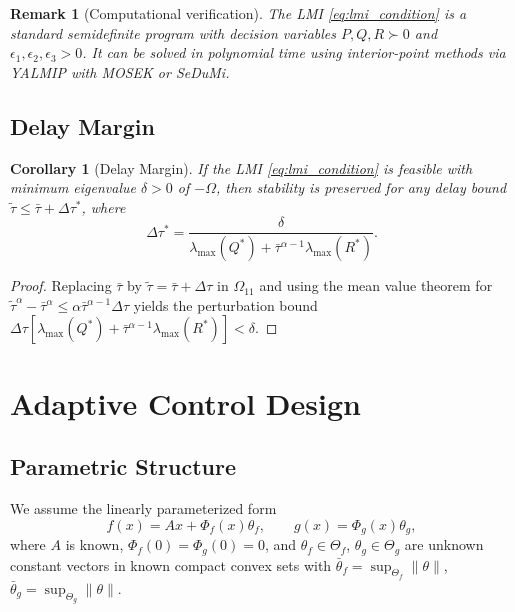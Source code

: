 \documentclass[12pt,a4paper]{article}
\newtheorem{corollary}[theorem]{Corollary}
\newtheorem{remark}{Remark}
\begin{document}
\begin{remark}[Computational verification]
The LMI \eqref{eq:lmi_condition} is a standard semidefinite program with decision variables $P, Q, R \succ 0$ and $\epsilon_1, \epsilon_2, \epsilon_3 > 0$. It can be solved in polynomial time using interior-point methods via YALMIP \cite{lofberg2004} with MOSEK or SeDuMi.
\end{remark}

\subsection{Delay Margin}

\begin{corollary}[Delay Margin]
\label{cor:robustness}
If the LMI \eqref{eq:lmi_condition} is feasible with minimum eigenvalue $\delta > 0$ of $-\Omega$, then stability is preserved for any delay bound $\tilde{\tau} \leq \bar{\tau} + \Delta\tau^*$, where
\begin{equation}
\label{eq:delay_margin}
\Delta\tau^* = \frac{\delta}{\lambda_{\max}(Q^*) + \bar{\tau}^{\alpha-1} \lambda_{\max}(R^*)}.
\end{equation}
\end{corollary}

\begin{proof}
Replacing $\bar{\tau}$ by $\tilde{\tau} = \bar{\tau} + \Delta\tau$ in $\Omega_{11}$ and using the mean value theorem for $\tilde{\tau}^{\alpha} - \bar{\tau}^{\alpha} \leq \alpha \bar{\tau}^{\alpha-1}\Delta\tau$ yields the perturbation bound $\Delta\tau[\lambda_{\max}(Q^*) + \bar{\tau}^{\alpha-1}\lambda_{\max}(R^*)] < \delta$.
\end{proof}


\section{Adaptive Control Design}
\label{sec:adaptive}

\subsection{Parametric Structure}

We assume the linearly parameterized form
\begin{equation}
f(x) = Ax + \Phi_f(x)\theta_f, \qquad g(x) = \Phi_g(x)\theta_g,
\end{equation}
where $A$ is known, $\Phi_f(0) = \Phi_g(0) = 0$, and $\theta_f \in \Theta_f$, $\theta_g \in \Theta_g$ are unknown constant vectors in known compact convex sets with $\bar{\theta}_f = \sup_{\Theta_f}\|\theta\|$, $\bar{\theta}_g = \sup_{\Theta_g}\|\theta\|$.
\end{document}

